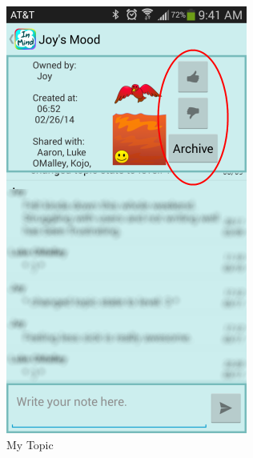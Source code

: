 \begin{figure}
\begin{subfigure}[b]{0.3\textwidth}
        \includegraphics[width=\textwidth]{topic_view_mine.png}
         \caption{My Topic}
      \end{subfigure}
      \begin{subfigure}[b]{0.3\textwidth}

\end{subfigure}
\end{figure}
